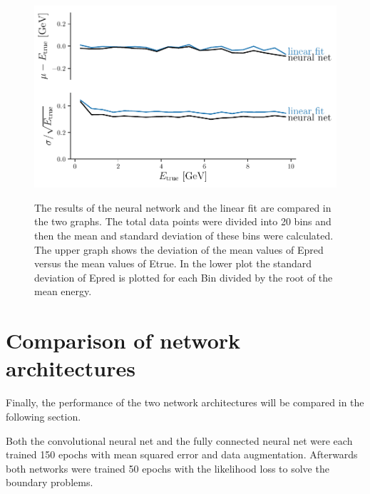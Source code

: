 \documentclass[12pt, a4paper]{thesis}
\begin{document}
\begin{figure}[htbp]
\centering
\includegraphics[width=.9\linewidth]{../images/likelihood_res.pdf}
\label{likelihood_res}
\caption{ The results of the neural network and the linear fit are
  compared in the two graphs. The total data points were divided into
  20 bins and then the mean and standard deviation of these bins were
  calculated. The upper graph shows the deviation of the mean values
  of Epred versus the mean values of Etrue. In the lower plot the
  standard deviation of Epred is plotted for each Bin divided by the
  root of the mean energy.}
\end{figure}

\section{Comparison of network architectures}
\label{sec:org1df3a0b}

Finally, the performance of the two network architectures will be
compared in the following section.

Both the convolutional neural net and the fully connected neural net
were each trained 150 epochs with mean squared error and data
augmentation. Afterwards both networks were trained 50 epochs with the
likelihood loss to solve the boundary problems.
\end{document}
